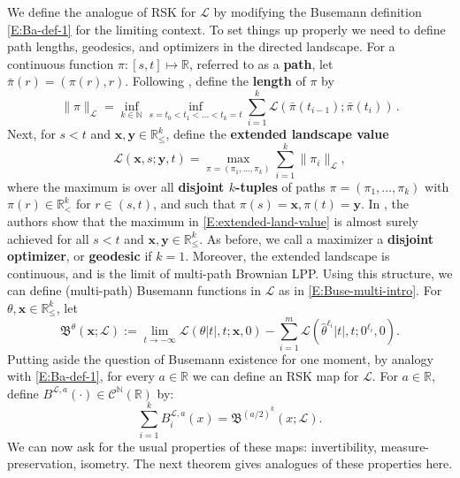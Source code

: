 \documentclass[11pt]{article}
\newcommand{\N}{\mathbb{N}}
\newcommand{\R}{\mathbb{R}}
\newcommand{\cC}{\mathcal{C}}
\newcommand{\cL}{\mathcal{L}}
\newcommand{\fB}{\mathfrak{B}}
\newcommand{\bx}{\mathbf{x}}
\newcommand{\by}{\mathbf{y}}
\theoremstyle{definition} %
\theoremstyle{remark} %
\begin{document}
We define the analogue of RSK for $\cL$ by modifying the Busemann definition \eqref{E:Ba-def-1} for the limiting context. To set things up properly we need to define path lengths, geodesics, and optimizers in the directed landscape.
For a continuous function $\pi:[s, t]\mapsto \R$,  referred to as a \textbf{path}, let $\bar \pi(r) = (\pi(r), r)$. Following \cite[Section 12]{DOV}, define the \textbf{length} of $\pi$ by
\begin{equation}
	\label{E:length}
	\|\pi\|_\cL=\inf_{k\in \N}\inf_{s=t_0<t_1<\ldots<t_k=t}\sum_{i=1}^k\cL(\bar \pi(t_{i-1});\bar \pi(t_i))\,.
\end{equation}
Next, for $s < t$ and $\bx, \by \in \R^k_\le$, define the \textbf{extended landscape value}
\begin{equation}
	\label{E:extended-land-value}
	\cL(\bx, s; \by, t) = \max_{\pi = (\pi_1, \dots, \pi_k)} \sum_{i=1}^k \|\pi_i\|_\cL,
\end{equation}
where the maximum is over all \textbf{disjoint $k$-tuples} of paths $\pi = (\pi_1, \dots, \pi_k)$ with $\pi(r) \in \R^k_<$ for $r \in (s, t)$, and such that $\pi(s) = \bx, \pi(t) = \by$. In \cite{dauvergne2021disjoint}, the authors show that the maximum in \eqref{E:extended-land-value} is almost surely achieved for all $s < t$ and $\bx, \by \in \R^k_\le$. As before, we call a maximizer a \textbf{disjoint optimizer}, or \textbf{geodesic} if $k = 1$. Moreover, the extended landscape is continuous, and is the limit of multi-path Brownian LPP. Using this structure, we can define (multi-path) Busemann functions in $\cL$ as in \eqref{E:Buse-multi-intro}. For $\theta, \bx \in \R^k_\le$, let
\begin{equation}
	\label{E:cL-busemann-intro}
	\fB^\theta(\bx; \cL) := \lim_{t \to -\infty} \cL(\theta |t|, t; \bx, 0) - \sum_{i=1}^{m} \cL( \hat \theta^{\ell_i} |t|, t; 0^{\ell_i}, 0).
\end{equation}
Putting aside the question of Busemann existence for one moment, by analogy with \eqref{E:Ba-def-1}, for every $a \in \R$ we can define an RSK map for $\cL$. For $a \in \R$, define $B^{\cL,a}(\cdot) \in \cC^\N(\R)$ by:
\begin{equation}
\label{E:B-a-L}
\sum_{i=1}^k B^{\cL,a}_i(x) = \fB^{(a/2)^k}(x; \cL).
\end{equation}
We can now ask for the usual properties of these maps: invertibility, measure-preservation, isometry. The next theorem gives analogues of these properties here. 
\end{document}
